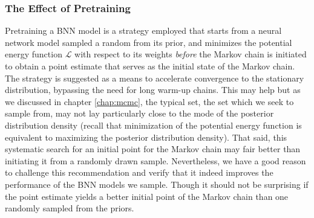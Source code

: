 \subsubsection{The Effect of Pretraining}
Pretraining a BNN model is a strategy employed that starts from a neural network model sampled a random from its prior, and minimizes the potential energy function $\mathcal{L}$ with respect to its weights \textit{before} the Markov chain is initiated to obtain a point estimate that serves as the initial state of the Markov chain. The strategy is suggested as a means to accelerate convergence to the stationary distribution, bypassing the need for long warm-up chains. This may help but as we discussed in chapter \ref{chap:mcmc}, the typical set, the set which we seek to sample from, may not lay particularly close to the mode of the posterior distribution density (recall that minimization of the potential energy function is equivalent to maximizing the posterior distribution density). That said, this systematic search for an initial point for the Markov chain may fair better than initiating it from a randomly drawn sample. Nevertheless, we have a good reason to challenge this recommendation and verify that it indeed improves the performance of the BNN models we sample. Though it should not be surprising if the point estimate yields a better initial point of the Markov chain than one randomly sampled from the priors.


